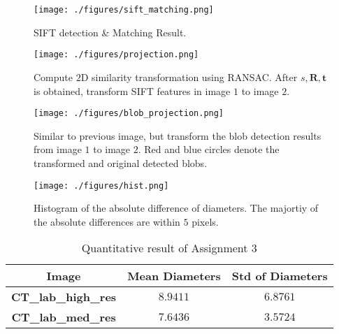 \documentclass[a4paper]{article}
\begin{document}
	\begin{figure}[htbp]
		\centering
		\texttt{[image: ./figures/sift\_matching.png]}
		\caption{SIFT detection \& Matching Result.}
	\end{figure}
	\begin{figure}[htbp]
	\centering
	\texttt{[image: ./figures/projection.png]}
	\caption{Compute $2$D similarity transformation using \textsc{RANSAC}. After $s,\mathbf{R,t}$ is obtained, transform SIFT features in image $1$ to image $2$.}
	\end{figure}
	\begin{figure}[htbp]
	\centering
	\texttt{[image: ./figures/blob\_projection.png]}
	\caption{Similar to previous image, but transform the blob detection results from image $1$ to image $2$. Red and blue circles denote the transformed and original detected blobs.}
\end{figure}
	\begin{figure}[htbp]
	\centering
	\texttt{[image: ./figures/hist.png]}
	\caption{Histogram of the absolute difference of diameters. The majortiy of the absolute differences are within $5$ pixels.}
\end{figure}
	\begin{table}
		\centering
		\caption{{Quantitative result of Assignment $3$}}
		\begin{tabular}{ccc}
			\hline
			\textbf{Image} &\textbf{Mean Diameters} & \textbf{Std of Diameters}  \\ \hline
			\textbf{CT\_lab\_high\_res} & $8.9411$ &   $6.8761$   \\ \hline
			\textbf{CT\_lab\_med\_res} & $7.6436$ &   $3.5724$  \\ \hline             
			\hline
		\end{tabular}
		\label{tb:mittest}
	\end{table}
	
	
\end{document}
